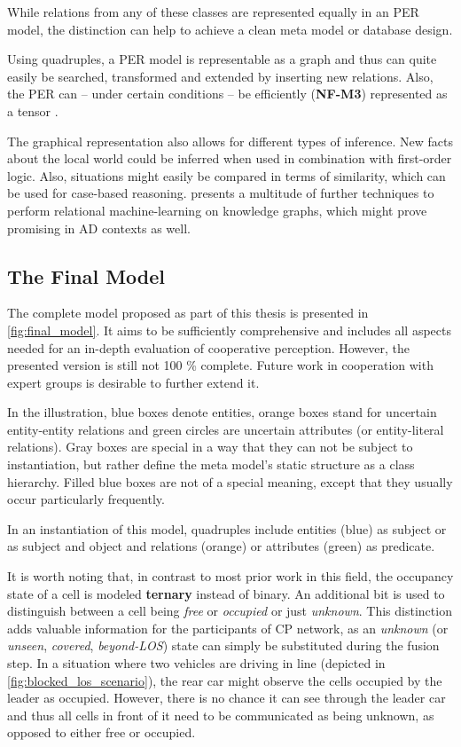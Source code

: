 While relations from any of these classes are represented equally in an PER model, the distinction can help to achieve a clean meta model or database design.
\par
\bigskip

Using quadruples, a PER model is representable as a graph and thus can quite easily be searched, transformed and extended by inserting new relations. Also, the PER can – under certain conditions – be efficiently (\textbf{NF-M3}) represented as a tensor \cite{Petrich2018}.

The graphical representation also allows for different types of inference. New facts about the local world could be inferred when used in combination with first-order logic. Also, situations might easily be compared in terms of similarity, which can be used for case-based reasoning. \cite{Nickel2016} presents a multitude of further techniques to perform relational machine-learning on knowledge graphs, which might prove promising in AD contexts as well. 

\subsection{The Final Model}
\label{subsec:concept_design:the_final_model}
The complete model proposed as part of this thesis is presented in \cref{fig:final_model}. It aims to be sufficiently comprehensive and includes all aspects needed for an in-depth evaluation of cooperative perception. However, the presented version is still not 100 \% complete. Future work in cooperation with expert groups is desirable to further extend it. 

In the illustration, blue boxes denote entities, orange boxes stand for uncertain entity-entity relations and green circles are uncertain attributes (or entity-literal relations). Gray boxes are special in a way that they can not be subject to instantiation, but rather define the meta model's static structure as a class hierarchy. Filled blue boxes are not of a special meaning, except that they usually occur particularly frequently.

In an instantiation of this model, quadruples include entities (blue) as subject or as subject and object and relations (orange) or attributes (green) as predicate. 

It is worth noting that, in contrast to most prior work in this field, the occupancy state of a cell is modeled \textbf{ternary} instead of binary. An additional bit is used to distinguish between a cell being \textit{free} or \textit{occupied} or just \textit{unknown}. This distinction adds valuable information for the participants of CP network, as an  \textit{unknown} (or \textit{unseen}, \textit{covered}, \textit{beyond-LOS}) state can simply be substituted during the fusion step. In a situation where two vehicles are driving in line (depicted in \cref{fig:blocked_los_scenario}), the rear car might observe the cells occupied by the leader as occupied. However, there is no chance it can see through the leader car and thus all cells in front of it need to be communicated as being unknown, as opposed to either free or occupied.

